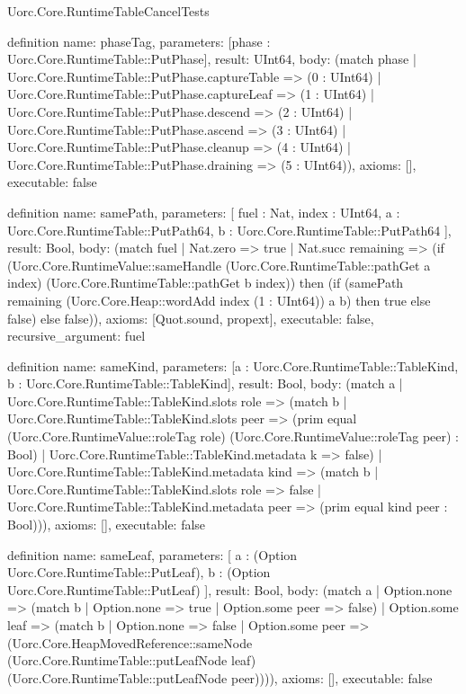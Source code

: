 \begin{lexlean}{Uorc.Core.RuntimeTableCancelTests}
\begin{semanticmodule}
definition{
  name: phaseTag,
  parameters: [phase : Uorc.Core.RuntimeTable::PutPhase],
  result: UInt64,
  body: (match phase
    | Uorc.Core.RuntimeTable::PutPhase.captureTable => (0 : UInt64)
    | Uorc.Core.RuntimeTable::PutPhase.captureLeaf => (1 : UInt64)
    | Uorc.Core.RuntimeTable::PutPhase.descend => (2 : UInt64)
    | Uorc.Core.RuntimeTable::PutPhase.ascend => (3 : UInt64)
    | Uorc.Core.RuntimeTable::PutPhase.cleanup => (4 : UInt64)
    | Uorc.Core.RuntimeTable::PutPhase.draining => (5 : UInt64)),
  axioms: [],
  executable: false
}

definition{
  name: samePath,
  parameters: [
    fuel : Nat,
    index : UInt64,
    a : Uorc.Core.RuntimeTable::PutPath64,
    b : Uorc.Core.RuntimeTable::PutPath64
  ],
  result: Bool,
  body: (match fuel
    | Nat.zero => true
    | Nat.succ remaining => (if (Uorc.Core.RuntimeValue::sameHandle (Uorc.Core.RuntimeTable::pathGet a index) (Uorc.Core.RuntimeTable::pathGet b index)) then (if (samePath remaining (Uorc.Core.Heap::wordAdd index (1 : UInt64)) a b) then true else false) else false)),
  axioms: [Quot.sound, propext],
  executable: false,
  recursive_argument: fuel
}

definition{
  name: sameKind,
  parameters: [a : Uorc.Core.RuntimeTable::TableKind, b : Uorc.Core.RuntimeTable::TableKind],
  result: Bool,
  body: (match a
    | Uorc.Core.RuntimeTable::TableKind.slots role => (match b
      | Uorc.Core.RuntimeTable::TableKind.slots peer => (prim equal (Uorc.Core.RuntimeValue::roleTag role) (Uorc.Core.RuntimeValue::roleTag peer) : Bool)
      | Uorc.Core.RuntimeTable::TableKind.metadata k => false)
    | Uorc.Core.RuntimeTable::TableKind.metadata kind => (match b
      | Uorc.Core.RuntimeTable::TableKind.slots role => false
      | Uorc.Core.RuntimeTable::TableKind.metadata peer => (prim equal kind peer : Bool))),
  axioms: [],
  executable: false
}

definition{
  name: sameLeaf,
  parameters: [
    a : (Option Uorc.Core.RuntimeTable::PutLeaf),
    b : (Option Uorc.Core.RuntimeTable::PutLeaf)
  ],
  result: Bool,
  body: (match a
    | Option.none => (match b | Option.none => true | Option.some peer => false)
    | Option.some leaf => (match b
      | Option.none => false
      | Option.some peer => (Uorc.Core.HeapMovedReference::sameNode (Uorc.Core.RuntimeTable::putLeafNode leaf) (Uorc.Core.RuntimeTable::putLeafNode peer)))),
  axioms: [],
  executable: false
}


\end{semanticmodule}
\end{lexlean}
